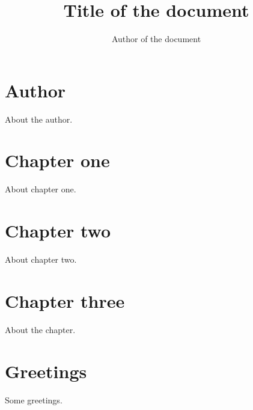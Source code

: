 \documentclass[11pt,a5paper]{book}
\title{Title of the document}
\author{Author of the document}
\begin{document}

\maketitle %

\tableofcontents %

\chapter*{Author}

About the author.

\chapter{Chapter one}

About chapter one.

\chapter{Chapter two}

About chapter two.

\chapter{Chapter three}

About the chapter.

\chapter*{Greetings}

Some greetings.
\end{document}
